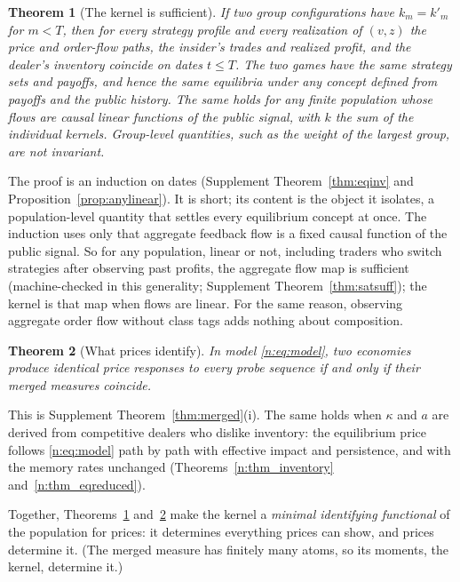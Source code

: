 \documentclass[12pt]{article}
\newtheorem{theorem}{Theorem}[section]
\theoremstyle{definition}
\theoremstyle{remark}
\begin{document}
\begin{theorem}[The kernel is sufficient]\label{n:suff}
If two group configurations have $k_m=k'_m$ for $m<T$, then for every strategy profile and every realization of $(v,z)$ the price and order-flow paths, the insider's trades and realized profit, and the dealer's inventory coincide on dates $t\le T$. The two games have the same strategy sets and payoffs, and hence the same equilibria under any concept defined from payoffs and the public history. The same holds for any finite population whose flows are causal linear functions of the public signal, with $k$ the sum of the individual kernels. Group-level quantities, such as the weight of the largest group, are not invariant.
\end{theorem}

The proof is an induction on dates (Supplement Theorem~\ref{thm:eqinv} and Proposition~\ref{prop:anylinear}). It is short; its content is the object it isolates, a population-level quantity that settles every equilibrium concept at once. The induction uses only that aggregate feedback flow is a fixed causal function of the public signal. So for any population, linear or not, including traders who switch strategies after observing past profits, the aggregate flow map is sufficient (machine-checked in this generality; Supplement Theorem~\ref{thm:satsuff}); the kernel is that map when flows are linear. For the same reason, observing aggregate order flow without class tags adds nothing about composition.

\begin{theorem}[What prices identify]\label{n:ident}
In model \eqref{n:eq:model}, two economies produce identical price responses to every probe sequence if and only if their merged measures coincide.
\end{theorem}

This is Supplement Theorem~\ref{thm:merged}(i). The same holds when $\kappa$ and $a$ are derived from competitive dealers who dislike inventory: the equilibrium price follows \eqref{n:eq:model} path by path with effective impact and persistence, and with the memory rates unchanged (Theorems~\ref{n:thm_inventory} and~\ref{n:thm_eqreduced}).

Together, Theorems~\ref{n:suff} and~\ref{n:ident} make the kernel a \emph{minimal identifying functional} of the population for prices: it determines everything prices can show, and prices determine it. (The merged measure has finitely many atoms, so its moments, the kernel, determine it.)
\end{document}
